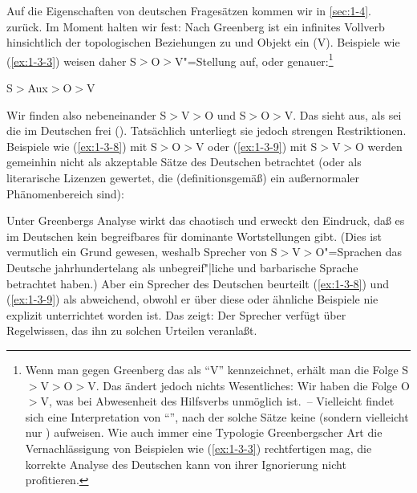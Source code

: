 \documentclass[output=paper]{langsci/langscibook}
\begin{document}
Auf die Eigenschaften von deutschen Fragesätzen kommen wir in
\ref{sec:1-4}. zurück. Im Moment halten wir fest: Nach Greenberg ist
ein infinites Vollverb hinsichtlich der topologischen Beziehungen zu
 und Objekt ein  (V). Beispiele wie (\ref{ex:1-3-3})
weisen daher S$>$O$>$V"=Stellung auf, oder genauer:\footnote{%
  Wenn man
  gegen Greenberg das  als "`V"' kennzeichnet, erhält man die
  Folge S$>$V$>$O$>$V. Das ändert jedoch nichts Wesentliches: Wir
  haben die Folge O$>$V, was bei Abwesenheit des Hilfsverbs unmöglich
  ist.~-- Vielleicht findet sich eine Interpretation von "`"',
  nach der solche Sätze keine  (sondern vielleicht nur
  )  aufweisen. Wie auch immer eine Typologie
  Greenbergscher Art die Vernachlässigung von Beispielen wie
  (\ref{ex:1-3-3}) rechtfertigen mag, die korrekte Analyse des
  Deutschen kann von ihrer Ignorierung nicht profitieren.%
}
\begin{exe}
\ex\label{ex:1-3-7}
S$>$Aux$>$O$>$V
\end{exe}
Wir finden also nebeneinander S$>$V$>$O und S$>$O$>$V. Das sieht aus, als sei die  im Deutschen frei (). Tatsächlich unterliegt sie jedoch strengen Restriktionen. Beispiele wie (\ref{ex:1-3-8}) mit S$>$O$>$V oder (\ref{ex:1-3-9}) mit S$>$V$>$O werden gemeinhin
nicht als akzeptable Sätze des Deutschen betrachtet (oder als literarische Lizenzen
gewertet, die (definitionsgemäß) ein außernormaler Phänomenbereich sind):
\begin{exe}
\ex\label{ex:1-3-8}
\begin{xlist}
\end{xlist}
\end{exe}
\begin{exe}
\ex\label{ex:1-3-9}
\begin{xlist}
\end{xlist}
\end{exe}
Unter Greenbergs Analyse wirkt das chaotisch und erweckt den Eindruck, daß es im
Deutschen kein begreifbares  für dominante Wortstellungen gibt. (Dies ist
vermutlich ein Grund gewesen, weshalb Sprecher von S$>$V$>$O"=Sprachen das Deutsche jahrhundertelang als unbegreif"|liche und barbarische Sprache betrachtet haben.)
Aber ein Sprecher des Deutschen beurteilt (\ref{ex:1-3-8}) und (\ref{ex:1-3-9}) als abweichend, obwohl er
über diese oder ähnliche Beispiele nie explizit unterrichtet worden ist. Das zeigt: Der
Sprecher verfügt über Regelwissen, das ihn zu solchen Urteilen veranlaßt.
\end{document}
